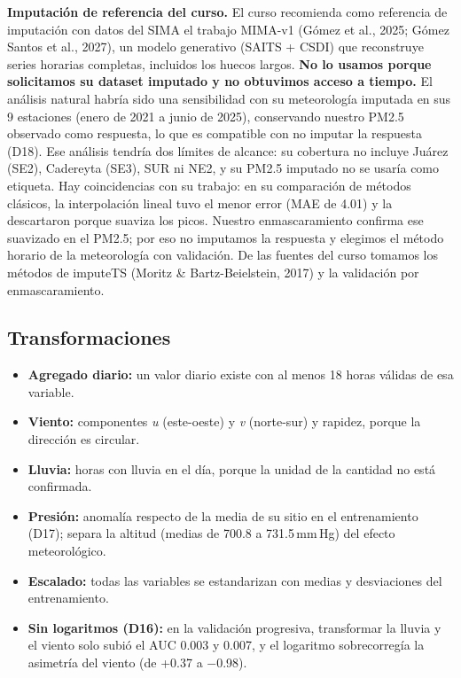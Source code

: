 \textbf{Imputación de referencia del curso.} El curso recomienda como referencia de imputación con datos del SIMA el trabajo MIMA-v1 (Gómez et al., 2025; Gómez Santos et al., 2027), un modelo generativo (SAITS + CSDI) que reconstruye series horarias completas, incluidos los huecos largos. \textbf{No lo usamos porque solicitamos su dataset imputado y no obtuvimos acceso a tiempo.} El análisis natural habría sido una sensibilidad con su meteorología imputada en sus 9 estaciones (enero de 2021 a junio de 2025), conservando nuestro PM2.5 observado como respuesta, lo que es compatible con no imputar la respuesta (D18). Ese análisis tendría dos límites de alcance: su cobertura no incluye Juárez (SE2), Cadereyta (SE3), SUR ni NE2, y su PM2.5 imputado no se usaría como etiqueta. Hay coincidencias con su trabajo: en su comparación de métodos clásicos, la interpolación lineal tuvo el menor error (MAE de 4.01) y la descartaron porque suaviza los picos. Nuestro enmascaramiento confirma ese suavizado en el PM2.5; por eso no imputamos la respuesta y elegimos el método horario de la meteorología con validación. De las fuentes del curso tomamos los métodos de imputeTS (Moritz \& Bartz-Beielstein, 2017) y la validación por enmascaramiento.

\subsection{Transformaciones}
\begin{itemize}
\item \textbf{Agregado diario:} un valor diario existe con al menos 18 horas válidas de esa variable.
\item \textbf{Viento:} componentes \emph{u} (este-oeste) y \emph{v} (norte-sur) y rapidez, porque la dirección es circular.
\item \textbf{Lluvia:} horas con lluvia en el día, porque la unidad de la cantidad no está confirmada.
\item \textbf{Presión:} anomalía respecto de la media de su sitio en el entrenamiento (D17); separa la altitud (medias de 700.8 a 731.5\,mm\,Hg) del efecto meteorológico.
\item \textbf{Escalado:} todas las variables se estandarizan con medias y desviaciones del entrenamiento.
\item \textbf{Sin logaritmos (D16):} en la validación progresiva, transformar la lluvia y el viento solo subió el AUC 0.003 y 0.007, y el logaritmo sobrecorregía la asimetría del viento (de +0.37 a −0.98).
\end{itemize}

